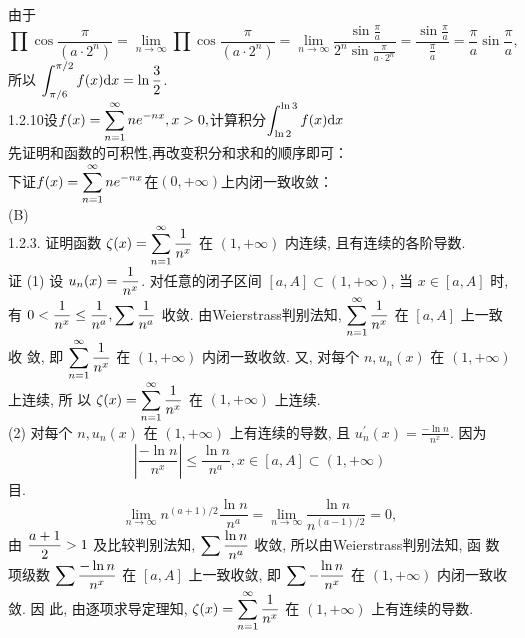 \documentclass[a4paper,11pt,UTF8]{article}
\begin{document}
由于
$$
\prod \cos \frac{\pi}{\left(a \cdot 2^n\right)}=\lim _{n \rightarrow \infty} \prod \cos \frac{\pi}{\left(a \cdot 2^n\right)}=\lim _{n \rightarrow \infty} \frac{\sin \frac{\pi}{a}}{2^n \sin \frac{\pi}{a \cdot 2^n}}=\frac{\sin \frac{\pi}{a}}{\frac{\pi}{a}}=\frac{\pi}{a} \sin \frac{\pi}{a},
$$
所以 $\displaystyle \displaystyle \displaystyle \int_{\pi / 6}^{\pi / 2} f(x) \mathrm{d} x=\ln \frac{3}{2}$.\\
1.2.10设$\displaystyle \displaystyle \displaystyle f(x) = \sum _{n = 1}^\infty ne^{-nx}, x > 0,$计算积分$\displaystyle \displaystyle \displaystyle \int_{\ln 2}^{\ln 3}f(x)\mathrm{d}x$\\
先证明和函数的可积性,再改变积分和求和的顺序即可：\\
下证$\displaystyle \displaystyle \displaystyle f(x) = \sum _{n = 1}^\infty ne^{-nx}$在$(0,+\infty)$上内闭一致收敛：\\
(B)\\
1.2.3. 证明函数 $\displaystyle \displaystyle \displaystyle \zeta(x)=\sum_{n=1}^{\infty} \frac{1}{n^x}$ 在 $(1,+\infty)$ 内连续, 且有连续的各阶导数.\\
证 (1) 设 $\displaystyle \displaystyle \displaystyle u_n(x)=\frac{1}{n^x}$. 对任意的闭子区间 $[a, A] \subset(1,+\infty)$, 当 $x \in[a, A]$ 时, 有 $\displaystyle \displaystyle \displaystyle  0<\frac{1}{n^x} \leq \frac{1}{n^a}, \sum \frac{1}{n^a}$ 收敛. 由Weierstrass判别法知, $\displaystyle \displaystyle \displaystyle \sum_{n=1}^{\infty} \frac{1}{n^x}$ 在 $[a, A]$ 上一致收 敛, 即 $\displaystyle \displaystyle \displaystyle \sum_{n=1}^{\infty} \frac{1}{n^x}$ 在 $(1,+\infty)$ 内闭一致收敛. 又, 对每个 $n, u_n(x)$ 在 $(1,+\infty)$ 上连续, 所 以 $\displaystyle \displaystyle \displaystyle \zeta(x)=\sum_{n=1}^{\infty} \frac{1}{n^x}$ 在 $(1,+\infty)$ 上连续.\\
(2) 对每个 $n, u_n(x)$ 在 $(1,+\infty)$ 上有连续的导数, 且 $u_n^{\prime}(x)=\frac{-\ln n}{n^x}$. 因为
$$
\left|\frac{-\ln n}{n^x}\right| \leq \frac{\ln n}{n^a}, x \in[a, A] \subset(1,+\infty)
$$
目.\\
$$
\lim _{n \rightarrow \infty} n^{(a+1) / 2} \frac{\ln n}{n^a}=\lim _{n \rightarrow \infty} \frac{\ln n}{n^{(a-1) / 2}}=0,
$$
由 $\displaystyle \displaystyle \displaystyle \frac{a+1}{2}>1$ 及比较判别法知, $\displaystyle \displaystyle \displaystyle \sum \frac{\ln n}{n^a}$ 收敛, 所以由Weierstrass判别法知, 函 数项级数 $\displaystyle \displaystyle \displaystyle \sum \frac{-\ln n}{n^x}$ 在 $[a, A]$ 上一致收敛, 即 $\displaystyle \displaystyle \displaystyle \sum -\frac{\ln n}{n^x}$ 在 $(1,+\infty)$ 内闭一致收敛. 因 此, 由逐项求导定理知, $\displaystyle \displaystyle \displaystyle \zeta(x)=\sum_{n=1}^{\infty} \frac{1}{n^x}$ 在 $(1,+\infty)$ 上有连续的导数.\\
\end{document}
